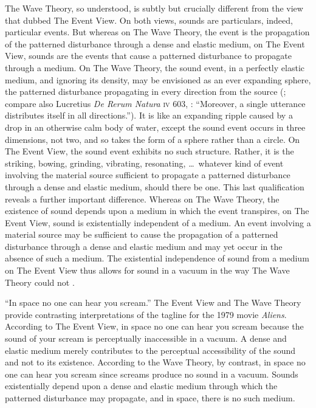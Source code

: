 The Wave Theory, so understood, is subtly but crucially different from the view that \citet{OCallaghan:2007xy} dubbed The Event View. On both views, sounds are particulars, indeed, particular events. But whereas on The Wave Theory, the event is the propagation of the patterned disturbance through a dense and elastic medium, on The Event View, sounds are the events that cause a patterned disturbance to propagate through a medium. On The Wave Theory, the sound event, in a perfectly elastic medium, and ignoring its density, may be envisioned as an ever expanding sphere, the patterned disturbance propagating in every direction from the source (\citealt{Sorensen:2009aa}; compare also Lucretius \emph{De Rerum Natura} \textsc{iv} 603, \citealt{Smith:2001aa}: ``Moreover, a single utterance distributes itself in all directions.''). It is like an expanding ripple caused by a drop in an otherwise calm body of water, except the sound event occurs in three dimensions, not two, and so takes the form of a sphere rather than a circle. On The Event View, the sound event exhibits no such structure. Rather, it is the striking, bowing, grinding, vibrating, resonating, \ldots\ whatever kind of event involving the material source sufficient to propagate a patterned disturbance through a dense and elastic medium, should there be one. This last qualification reveals a further important difference. Whereas on The Wave Theory, the existence of sound depends upon a medium in which the event transpires, on The Event View, sound is existentially independent of a medium. An event involving a material source may be sufficient to cause the propagation of a patterned disturbance through a dense and elastic medium and may yet occur in the absence of such a medium. The existential independence of sound from a medium on The Event View thus allows for sound in a vacuum in the way The Wave Theory could not \citep{OCallaghan:2007xy,OCallaghan:2009aa}. 

``In space no one can hear you scream.'' The Event View and The Wave Theory provide contrasting interpretations of the tagline for the 1979 movie \emph{Aliens}. According to The Event View, in space no one can hear you scream because the sound of your scream is perceptually inaccessible in a vacuum. A dense and elastic medium merely contributes to the perceptual accessibility of the sound and not to its existence. According to the Wave Theory, by contrast, in space no one can hear you scream since screams produce no sound in a vacuum. Sounds existentially depend upon a dense and elastic medium through which the patterned disturbance may propagate, and in space, there is no such medium.

